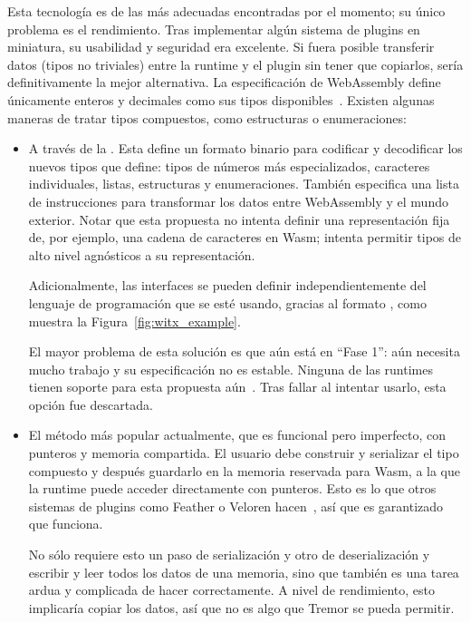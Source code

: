 Esta tecnología es de las más adecuadas encontradas por el momento; su único
problema es el rendimiento. Tras implementar algún sistema de plugins en
miniatura, su usabilidad y seguridad era excelente. Si fuera posible transferir
datos (tipos no triviales) entre la runtime y el plugin sin tener que copiarlos,
sería definitivamente la mejor alternativa. La especificación de WebAssembly
define únicamente enteros y decimales como sus tipos
disponibles~\cite{wasmertypes}. Existen algunas maneras de tratar tipos
compuestos, como estructuras o enumeraciones:

\begin{itemize}
    \item A través de la . Esta define un formato
        binario para codificar y decodificar los nuevos tipos que define: tipos
        de números más especializados, caracteres individuales, listas,
        estructuras y enumeraciones. También especifica una lista de
        instrucciones para transformar los datos entre WebAssembly y el mundo
        exterior. Notar que esta propuesta no intenta definir una representación
        fija de, por ejemplo, una cadena de caracteres en Wasm; intenta permitir
        tipos de alto nivel agnósticos a su representación.

        Adicionalmente, las interfaces se pueden definir independientemente del
        lenguaje de programación que se esté usando, gracias al formato
        , como muestra la Figura~\ref{fig:witx_example}.

        El mayor problema de esta solución es que aún está en ``Fase 1'': aún
        necesita mucho trabajo y su especificación no es estable. Ninguna de las
        runtimes tienen soporte para esta propuesta
        aún~\cite{interfacetypeswasmtime}\cite{interfacetypeswasmer}. Tras
        fallar al intentar usarlo, esta opción fue descartada.

    \item El método más popular actualmente, que es funcional pero imperfecto,
        con punteros y memoria compartida. El usuario debe construir y
        serializar el tipo compuesto y después guardarlo en la memoria reservada
        para Wasm, a la que la runtime puede acceder directamente con punteros.
        Esto es lo que otros sistemas de plugins como Feather o Veloren
        hacen~\cite{featherpluginsystem}\cite{velorenpluginsystem}, así que es
        garantizado que funciona.

        No sólo requiere esto un paso de serialización y otro de deserialización
        y escribir y leer todos los datos de una memoria, sino que también es
        una tarea ardua y complicada de hacer correctamente. A nivel de
        rendimiento, esto implicaría copiar los datos, así que no es algo que
        Tremor se pueda permitir.


\end{itemize}

